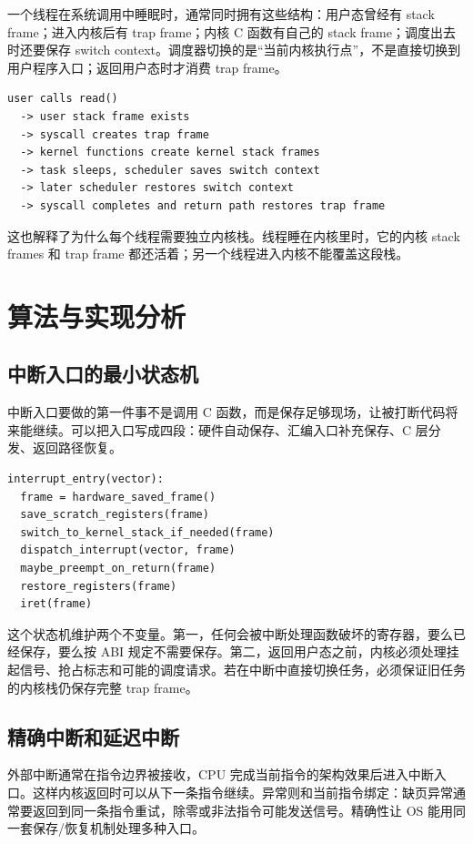 一个线程在系统调用中睡眠时，通常同时拥有这些结构：用户态曾经有 stack frame；进入内核后有 trap frame；内核 C 函数有自己的 stack frame；调度出去时还要保存 switch context。调度器切换的是“当前内核执行点”，不是直接切换到用户程序入口；返回用户态时才消费 trap frame。

\begin{lstlisting}
user calls read()
  -> user stack frame exists
  -> syscall creates trap frame
  -> kernel functions create kernel stack frames
  -> task sleeps, scheduler saves switch context
  -> later scheduler restores switch context
  -> syscall completes and return path restores trap frame
\end{lstlisting}

这也解释了为什么每个线程需要独立内核栈。线程睡在内核里时，它的内核 stack frames 和 trap frame 都还活着；另一个线程进入内核不能覆盖这段栈。

\section{算法与实现分析}

\subsection{中断入口的最小状态机}

中断入口要做的第一件事不是调用 C 函数，而是保存足够现场，让被打断代码将来能继续。可以把入口写成四段：硬件自动保存、汇编入口补充保存、C 层分发、返回路径恢复。

\begin{lstlisting}
interrupt_entry(vector):
  frame = hardware_saved_frame()
  save_scratch_registers(frame)
  switch_to_kernel_stack_if_needed(frame)
  dispatch_interrupt(vector, frame)
  maybe_preempt_on_return(frame)
  restore_registers(frame)
  iret(frame)
\end{lstlisting}

这个状态机维护两个不变量。第一，任何会被中断处理函数破坏的寄存器，要么已经保存，要么按 ABI 规定不需要保存。第二，返回用户态之前，内核必须处理挂起信号、抢占标志和可能的调度请求。若在中断中直接切换任务，必须保证旧任务的内核栈仍保存完整 trap frame。

\subsection{精确中断和延迟中断}

外部中断通常在指令边界被接收，CPU 完成当前指令的架构效果后进入中断入口。这样内核返回时可以从下一条指令继续。异常则和当前指令绑定：缺页异常通常要返回到同一条指令重试，除零或非法指令可能发送信号。精确性让 OS 能用同一套保存/恢复机制处理多种入口。

